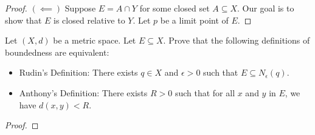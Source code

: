 \documentclass[a4paper]{article}
\begin{document}
\begin{proof}
    \( (\impliedby) \) Suppose \( E = A \cap Y  \) for some closed set \( A \subseteq X  \). Our goal is to show that \( E  \) is closed relative to \( Y  \). Let \( p  \) be a limit point of \( E  \). 



   \end{proof}
   
   \begin{problem}
   Let \( (X,d) \) be a metric space. Let \( E \subseteq  X \). Prove that the following definitions of boundedness are equivalent:
    \begin{itemize}
        \item Rudin's Definition: There exists \( q \in X  \) and \( \epsilon > 0  \) such that \( E \subseteq {N}_{\epsilon}(q) \).
        \item Anthony's Definition: There exists \( R > 0  \) such that for all \( x  \) and \( y  \) in \( E  \), we have \( d(x,y) < R  \).
    \end{itemize}
   \end{problem}
   \begin{proof}
     
   \end{proof}
\end{document}
